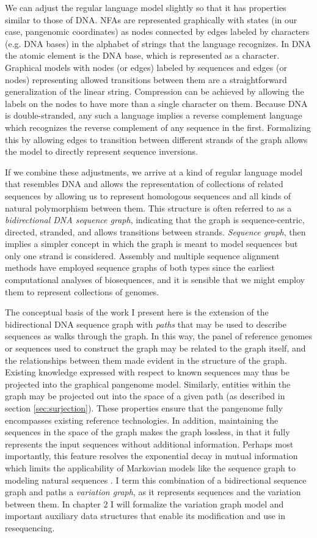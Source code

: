 We can adjust the regular language model slightly so that it has properties similar to those of DNA.
NFAs are represented graphically with states (in our case, pangenomic coordinates) as nodes connected by edges labeled by characters (e.g. DNA bases) in the alphabet of strings that the language recognizes.
In DNA the atomic element is the DNA base, which is represented as a character.
Graphical models with nodes (or edges) labeled by sequences and edges (or nodes) representing allowed transitions between them are a straightforward generalization of the linear string.
Compression can be achieved by allowing the labels on the nodes to have more than a single character on them.
Because DNA is double-stranded, any such a language implies a reverse complement language which recognizes the reverse complement of any sequence in the first.
Formalizing this by allowing edges to transition between different strands of the graph allows the model to directly represent sequence inversions.

If we combine these adjustments, we arrive at a kind of regular language model that resembles DNA and allows the representation of collections of related sequences by allowing us to represent homologous sequences and all kinds of natural polymorphism between them.
This structure is often referred to as a \emph{bidirectional DNA sequence graph}, indicating that the graph is sequence-centric, directed, stranded, and allows transitions between strands.
\emph{Sequence graph}, then implies a simpler concept in which the graph is meant to model sequences but only one strand is considered.
Assembly and multiple sequence alignment methods have employed sequence graphs of both types since the earliest computational analyses of biosequences, and it is sensible that we might employ them to represent collections of genomes.

The conceptual basis of the work I present here is the extension of the bidirectional DNA sequence graph with \emph{paths} that may be used to describe sequences as walks through the graph.
In this way, the panel of reference genomes or sequences used to construct the graph may be related to the graph itself, and the relationships between them made evident in the structure of the graph.
Existing knowledge expressed with respect to known sequences may thus be projected into the graphical pangenome model.
Similarly, entities within the graph may be projected out into the space of a given path (as described in section \ref{sec:surjection}).
These properties ensure that the pangenome fully encompasses existing reference technologies.
In addition, maintaining the sequences in the space of the graph makes the graph lossless, in that it fully represents the input sequences without additional information.
Perhaps most importantly, this feature resolves the exponential decay in mutual information which limits the applicability of Markovian models like the sequence graph to modeling natural sequences \cite{lin2017critical}.
I term this combination of a bidirectional sequence graph and paths a \emph{variation graph}, as it represents sequences and the variation between them.
In chapter 2 I will formalize the variation graph model and important auxiliary data structures that enable its modification and use in resequencing.

